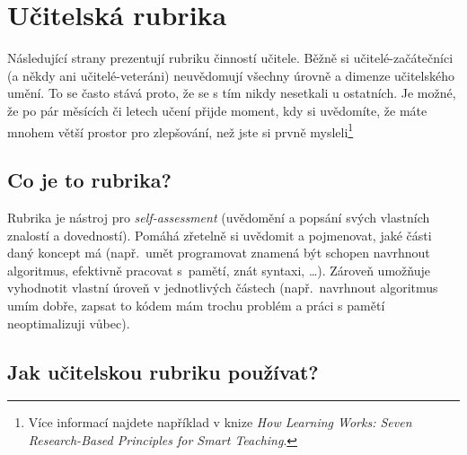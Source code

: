 
\newcommand{\rubriccriterion}[4]{
\stepcounter{rubricquestion}
\section*{\therubricquestion: #1}

\smallskip
\note{Neznalý:} #2

\note{Začátečník:} #3

\note{Guru:} #4

\medskip
\begin{tikzpicture}
\draw (0,0) -- (8,0);
\foreach \i in {0,1,...,8} %
{
\fill[black] (\i,0) circle (1.5 mm);
\fill[white] (\i,0) circle (1.4 mm);
}
\node at (0.15, -0.5) {neznalý};
\node at (3, -0.5)    {začátečník};
\node at (8, -0.5)    {guru};
\end{tikzpicture}
}

\restoregeometry
\chapter*{Učitelská rubrika}
\label{rubric}

Následující strany prezentují rubriku činností učitele. Běžně si učitelé-začátečníci (a někdy ani učitelé-veteráni) neuvědomují všechny úrovně a dimenze učitelského umění. To se často stává proto, že se s tím nikdy nesetkali u ostatních. Je možné, že po pár měsících či letech učení přijde moment, kdy si uvědomíte, že máte mnohem větší prostor pro zlepšování, než jste si prvně mysleli\footnote{Více informací najdete například v knize \emph{How Learning Works: Seven Research-Based Principles for Smart Teaching}.}

\section*{Co je to rubrika?}

Rubrika je nástroj pro \emph{self-assessment} (uvědomění a popsání svých vlastních znalostí a dovedností). Pomáhá zřetelně si uvědomit a pojmenovat, jaké části daný koncept má (např.\ umět programovat znamená být schopen navrhnout algoritmus, efektivně pracovat s~pamětí, znát syntaxi, \dots). Zároveň umožňuje vyhodnotit vlastní úroveň v jednotlivých částech (např.\ navrhnout algoritmus umím dobře, zapsat to kódem mám trochu problém a práci s pamětí neoptimalizuji vůbec).

\section*{Jak učitelskou rubriku používat?}

